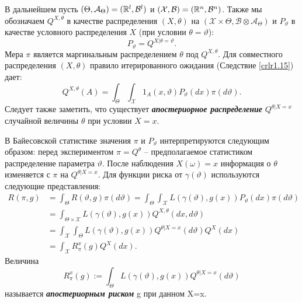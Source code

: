 \begin{asmp}
	В дальнейшем пусть $(\Theta, \mathcal{A}_\Theta) = (\mathbb{R}^l, \mathcal{B}^l)$ и $(\mathcal{X}, \mathcal{B})=(\mathbb{R}^n, \mathcal{B}^n)$. Также мы обозначаем $Q^{X,\theta}$ в качестве распределения $(X, \theta)$ на $(\mathcal{X} \times \Theta, \mathcal{B} \otimes \mathcal{A}_\Theta)$ и $P_\vartheta$ в качестве условного распределения $X$ (при условии $\theta = \vartheta$):
	\[P_\vartheta =Q^{X|\theta=\vartheta}. \]
	Мера $\pi$ является маргинальным распределением $\theta$ под $Q^{X,\theta}$. Для совместного распределения $(X,\theta)$ правило итерированного ожидания (Следствие \ref{crlr1.15}) дает:
	\[Q^{X,\theta}(A) = \int_{\Theta} \int_{\mathcal{X}} 1_A(x, \vartheta) P_\vartheta(dx) \pi(d \vartheta)   .\]
	Следует также заметить, что существует \textbf{\textit{апостериорное распределение}} $Q^{\theta|X=x}$ случайной величины $\theta$ при условии $X=x$.
\end{asmp}

\begin{rmrk}
		В Байесовской статистике значения $\pi$ и $P_\vartheta$ интерпретируются следующим образом: перед экспериментом $\pi=Q^\theta$ -- предполагаемое статистиком распределение параметра $\vartheta$. После наблюдения $X(\omega) = x$ информация о $\theta$ изменяется с $\pi$ на $Q^{\theta | X=x}$. Для функции риска от $\gamma(\vartheta)$ используются следующие представления:
		\[
		\begin{aligned}
		R(\pi,g) & =\int_\Theta R(\vartheta, g) \pi(d\vartheta)=\int_{\Theta} \int_{\mathcal{X}} L(\gamma(\vartheta), g(x)) P_\vartheta(dx) \pi(d\vartheta)\\
		& = \int_{\Theta \times \mathcal{X}} L(\gamma(\vartheta), g(x)) Q^{X,\theta} (dx, d\vartheta) \\
		& = \int_{\mathcal{X}} \int_{\Theta} L(\gamma(\vartheta), g(x)) Q^{\theta | X = x} (d\vartheta) Q^X(dx) \\
		& = \int_{\mathcal{X}} R_{\pi}^x(g) Q^X(dx).
		\end{aligned}
		\]
		Величина
		\[R_{\pi}^x(g) :=\int_{\Theta} L(\gamma(\vartheta), g(x)) Q^{\theta | X = x} (d\vartheta)\]
		называется \textbf{\textit{апостериорным риском}} g при данном X=x.
\end{rmrk}

